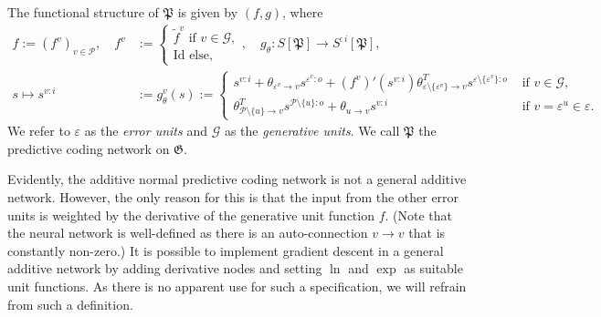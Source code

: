 \documentclass[a4paper,11pt]{report}
\begin{document}
\begin{The}
\begin{align*}
\end{align*}
The functional structure of $\mathfrak{P}$ is given by $(f,g)$, where
\begin{equation}
\begin{aligned}
f:=(f^v)_{v\in\mathcal{P}},
\quad
f^v&:=\begin{cases}
\tilde{f}^v\text{ if }v\in\mathcal{G},\\
\text{Id}\text{ else},
\end{cases},
\quad
g_{\theta}:S[\mathfrak{P}]\to S^{:i}[\mathfrak{P}],\\
s\mapsto s^{v:i}&:=g^v_{\theta}(s):=\begin{cases}
s^{v:i}+\theta_{\varepsilon^v\to v}s^{\varepsilon^v:o}+\left(f^v\right)'(s^{v:i})\theta_{\varepsilon\setminus\{\varepsilon^v\}\to v}^Ts^{\varepsilon\setminus\{\varepsilon^v\}:o}&\text{ if }v\in\mathcal{G},\\
\theta_{\mathcal{P}\setminus\{u\}\to v}^Ts^{\mathcal{P}\setminus\{u\}:o}+\theta_{u\to v}s^{v:i}&\text{ if }v=\varepsilon^u\in\varepsilon.
\end{cases}
\end{aligned}
\end{equation}
We refer to $\varepsilon$ as the \emph{error units} and $\mathcal{G}$ as the \emph{generative units}. We call $\mathfrak{P}$ the predictive coding network on $\mathfrak{G}$.
\end{The}

\begin{Par}
Evidently, the additive normal predictive coding network is not a general additive network. However, the only reason for this is that the input from the other error units is weighted by the derivative of the generative unit function $f$. (Note that the neural network is well-defined as there is an auto-connection $v\to v$ that is constantly non-zero.) It is possible to implement gradient descent in a general additive network by adding derivative nodes and setting $\ln$ and $\exp$ as suitable unit functions. As there is no apparent use for such a specification, we will refrain from such a definition.
\end{Par}
\end{document}
